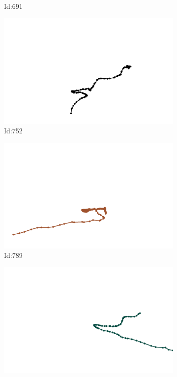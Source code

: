 \documentclass[12pt,twoside]{report}
\begin{document}
\begin{figure}
\begin{subfigure}[b]{0.20\textwidth}
\caption{Id:691}
\end{subfigure}
\begin{subfigure}[b]{0.20\textwidth}
\centering
\includegraphics[width=\textwidth]{../trajectories/752.png}
\caption{Id:752}
\end{subfigure}
\begin{subfigure}[b]{0.20\textwidth}
\centering
\includegraphics[width=\textwidth]{../trajectories/789.png}
\caption{Id:789}
\end{subfigure}
\begin{subfigure}[b]{0.20\textwidth}
\centering
\includegraphics[width=\textwidth]{../trajectories/818.png}

\end{subfigure}
\end{figure}
\end{document}

